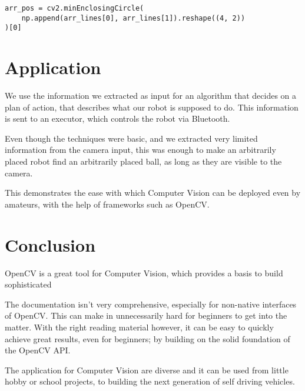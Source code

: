 \documentclass[12pt, a4paper]{article}
\begin{document}
\begin{lstlisting}
arr_pos = cv2.minEnclosingCircle(
    np.append(arr_lines[0], arr_lines[1]).reshape((4, 2))
)[0]
\end{lstlisting}

\section{Application}
We use the information we extracted as input for an algorithm that decides on a plan of action, that describes what our robot is supposed to do. This information is sent to an executor, which controls the robot via Bluetooth.

Even though the techniques were basic, and we extracted very limited information from the camera input, this was enough to make an arbitrarily placed robot find an arbitrarily placed ball, as long as they are visible to the camera.

This demonstrates the ease with which Computer Vision can be deployed even by amateurs, with the help of frameworks such as OpenCV.

\section{Conclusion}
OpenCV is a great tool for Computer Vision, which provides a basis to build sophisticated

The documentation isn't very comprehensive, especially for non-native interfaces of OpenCV. This can make in unnecessarily hard for beginners to get into the matter. With the right reading material however, it can be easy to quickly achieve great results, even for beginners; by building on the solid foundation of the OpenCV API.

The application for Computer Vision are diverse and it can be used from little hobby or school projects, to building the next generation of self driving vehicles.
\end{document}

